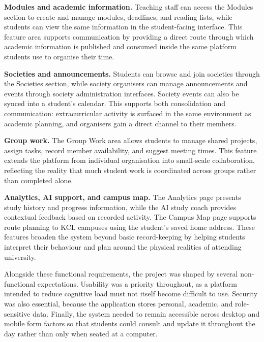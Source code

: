 \textbf{Modules and academic information.} Teaching staff can access the Modules section to create and manage modules, deadlines, and reading lists, while students can view the same information in the student-facing interface. This feature area supports communication by providing a direct route through which academic information is published and consumed inside the same platform students use to organise their time.

\textbf{Societies and announcements.} Students can browse and join societies through the Societies section, while society organisers can manage announcements and events through society administration interfaces. Society events can also be synced into a student's calendar. This supports both consolidation and communication: extracurricular activity is surfaced in the same environment as academic planning, and organisers gain a direct channel to their members.

\textbf{Group work.} The Group Work area allows students to manage shared projects, assign tasks, record member availability, and suggest meeting times. This feature extends the platform from individual organisation into small-scale collaboration, reflecting the reality that much student work is coordinated across groups rather than completed alone.

\textbf{Analytics, AI support, and campus map.} The Analytics page presents study history and progress information, while the AI study coach provides contextual feedback based on recorded activity. The Campus Map page supports route planning to KCL campuses using the student's saved home address. These features broaden the system beyond basic record-keeping by helping students interpret their behaviour and plan around the physical realities of attending university.

Alongside these functional requirements, the project was shaped by several non-functional expectations. Usability was a priority throughout, as a platform intended to reduce cognitive load must not itself become difficult to use. Security was also essential, because the application stores personal, academic, and role-sensitive data. Finally, the system needed to remain accessible across desktop and mobile form factors so that students could consult and update it throughout the day rather than only when seated at a computer.
